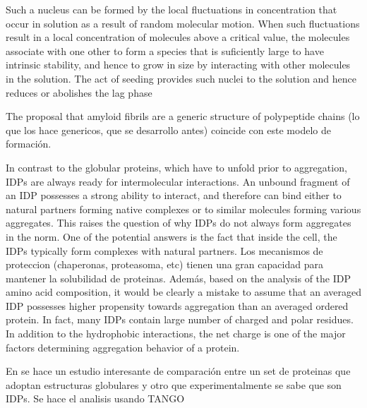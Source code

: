 Such a nucleus can be formed by the local fluctuations in concentration that occur in solution as a result of random molecular motion. When such fluctuations result in a local concentration of
molecules above a critical value, the molecules associate with one other to form a species that is suficiently large to have intrinsic stability, and hence to grow in size by interacting with other molecules in the solution. The act
of seeding provides such nuclei to the solution and hence reduces or abolishes the lag phase

The proposal that amyloid fibrils are a generic structure of polypeptide chains (lo que los hace genericos, que se desarrollo antes) coincide con este modelo de formación.











In contrast to the globular proteins, which have to unfold prior to aggregation, IDPs are always ready for intermolecular interactions. 
An unbound fragment of an IDP possesses a strong ability to interact, and therefore can bind either to natural partners forming native complexes or to similar molecules forming various aggregates. 
This raises the question of why IDPs do not always form aggregates in the norm. One of the potential answers is the fact that inside the cell, the IDPs typically form complexes with natural partners.
Los mecanismos de proteccion (chaperonas, proteasoma, etc) tienen una gran capacidad para mantener la solubilidad de proteinas.
Además, based on the analysis of the IDP amino acid composition, it would be clearly a mistake to assume that an averaged IDP possesses higher propensity towards aggregation than an averaged ordered
protein. In fact, many IDPs contain large number of charged and polar residues. In addition to the hydrophobic interactions, the net charge is one of the major factors determining aggregation behavior of a protein.

En \cite{linding2004comparative} se hace un estudio interesante de comparación entre un set de proteinas que adoptan estructuras globulares y otro que experimentalmente se sabe que son IDPs.
Se hace el analisis usando TANGO

